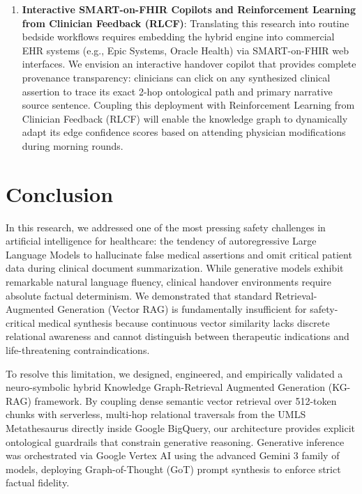 \documentclass[11pt, a4paper]{article}
\begin{document}
\begin{enumerate}
  \item \textbf{Interactive SMART-on-FHIR Copilots and Reinforcement Learning from Clinician Feedback (RLCF)}: Translating this research into routine bedside workflows requires embedding the hybrid engine into commercial EHR systems (e.g., Epic Systems, Oracle Health) via SMART-on-FHIR web interfaces. We envision an interactive handover copilot that provides complete provenance transparency: clinicians can click on any synthesized clinical assertion to trace its exact 2-hop ontological path and primary narrative source sentence. Coupling this deployment with Reinforcement Learning from Clinician Feedback (RLCF) will enable the knowledge graph to dynamically adapt its edge confidence scores based on attending physician modifications during morning rounds.
\end{enumerate}

\section{Conclusion}
In this research, we addressed one of the most pressing safety challenges in artificial intelligence for healthcare: the tendency of autoregressive Large Language Models to hallucinate false medical assertions and omit critical patient data during clinical document summarization. While generative models exhibit remarkable natural language fluency, clinical handover environments require absolute factual determinism. We demonstrated that standard Retrieval-Augmented Generation (Vector RAG) is fundamentally insufficient for safety-critical medical synthesis because continuous vector similarity lacks discrete relational awareness and cannot distinguish between therapeutic indications and life-threatening contraindications.

To resolve this limitation, we designed, engineered, and empirically validated a neuro-symbolic hybrid Knowledge Graph-Retrieval Augmented Generation (KG-RAG) framework. By coupling dense semantic vector retrieval over 512-token chunks with serverless, multi-hop relational traversals from the UMLS Metathesaurus directly inside Google BigQuery, our architecture provides explicit ontological guardrails that constrain generative reasoning. Generative inference was orchestrated via Google Vertex AI using the advanced Gemini 3 family of models, deploying Graph-of-Thought (GoT) prompt synthesis to enforce strict factual fidelity.
\end{document}
